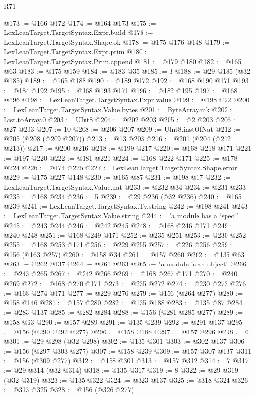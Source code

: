 \begin{lexlean}{R71}
\begin{coremodule}
@173 := @166 @172
@174 := @164 @173
@175 := LexLeanTarget.TargetSyntax.Expr.build
@176 := LexLeanTarget.TargetSyntax.Shape.ok
@178 := @175 @176 @148
@179 := LexLeanTarget.TargetSyntax.Expr.prim
@180 := LexLeanTarget.TargetSyntax.Prim.append
@181 := @179 @180
@182 := @165 @63
@183 := @175 @159
@184 := @183 @35
@185 := 3
@188 := @29 @185 (@32 @185)
@189 := @165 @188
@190 := @189 @172
@192 := @168 @190 @171
@193 := @184 @192
@195 := @168 @193 @171
@196 := @182 @195
@197 := @168 @196
@198 := LexLeanTarget.TargetSyntax.Expr.value
@199 := @198 @22
@200 := LexLeanTarget.TargetSyntax.Value.bytes
@201 := ByteArray.mk
@202 := List.toArray.{0}
@203 := UInt8
@204 := @202 @203
@205 := @2 @203
@206 := @27 @203
@207 := 10
@208 := @206 @207
@209 := UInt8.instOfNat
@212 := @205 (@208 (@209 @207))
@213 := @13 @203
@216 := @201 (@204 (@212 @213))
@217 := @200 @216
@218 := @199 @217
@220 := @168 @218 @171
@221 := @197 @220
@222 := @181 @221
@224 := @168 @222 @171
@225 := @178 @224
@226 := @174 @225
@227 := LexLeanTarget.TargetSyntax.Shape.error
@229 := @175 @227 @148
@230 := @165 @87
@231 := @198 @17
@232 := LexLeanTarget.TargetSyntax.Value.nat
@233 := @232 @34
@234 := @231 @233
@235 := @168 @234
@236 := 5
@239 := @29 @236 (@32 @236)
@240 := @165 @239
@241 := LexLeanTarget.TargetSyntax.Ty.string
@242 := @198 @241
@243 := LexLeanTarget.TargetSyntax.Value.string
@244 := "a module has a `spec`"
@245 := @243 @244
@246 := @242 @245
@248 := @168 @246 @171
@249 := @240 @248
@251 := @168 @249 @171
@252 := @235 @251
@253 := @230 @252
@255 := @168 @253 @171
@256 := @229 @255
@257 := @226 @256
@259 := @156 (@163 @257)
@260 := @158 @34
@261 := @157 @260
@262 := @135 @63
@263 := @262 @137
@264 := @261 @263
@265 := "a module is an object"
@266 := @243 @265
@267 := @242 @266
@269 := @168 @267 @171
@270 := @240 @269
@272 := @168 @270 @171
@273 := @235 @272
@274 := @230 @273
@276 := @168 @274 @171
@277 := @229 @276
@279 := @156 (@264 @277)
@280 := @158 @146
@281 := @157 @280
@282 := @135 @188
@283 := @135 @87
@284 := @283 @137
@285 := @282 @284
@288 := @156 (@281 @285 @277)
@289 := @158 @63
@290 := @157 @289
@291 := @135 @239
@292 := @291 @137
@295 := @156 (@290 @292 @277)
@296 := @158 @188
@297 := @157 @296
@298 := 6
@301 := @29 @298 (@32 @298)
@302 := @135 @301
@303 := @302 @137
@306 := @156 (@297 @303 @277)
@307 := @158 @239
@309 := @157 @307 @137
@311 := @156 (@309 @277)
@312 := @158 @301
@313 := @157 @312
@314 := 7
@317 := @29 @314 (@32 @314)
@318 := @135 @317
@319 := 8
@322 := @29 @319 (@32 @319)
@323 := @135 @322
@324 := @323 @137
@325 := @318 @324
@326 := @313 @325
@328 := @156 (@326 @277)

\end{coremodule}
\end{lexlean}
